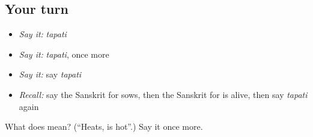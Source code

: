 \subsection*{Your turn}
\begin{itemize}
\raggedright
  \item \emph{Say it:} \emph{tapati}
  \item \emph{Say it:} \emph{tapati}, once more
  \item \emph{Say it:} say \emph{tapati}
  \item \emph{Recall:} say the Sanskrit for sows, then the Sanskrit for is alive, then say \emph{tapati} again
\end{itemize}

\begin{tcolorbox}[breakable,colback=teal!4,colframe=teal!35!black,title={Before you move on}]
What does  mean? (\textquotedblleft{}Heats, is hot\textquotedblright{}.) Say it once more.
\end{tcolorbox}
